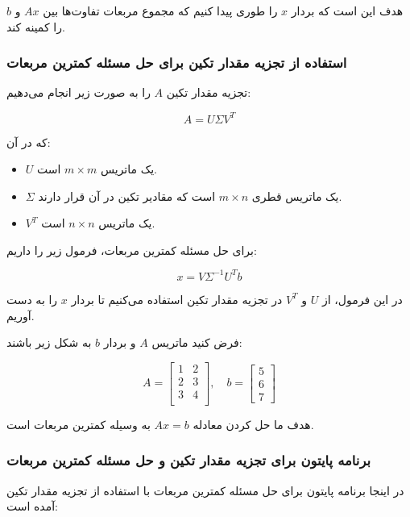 هدف این است که بردار \(x\) را طوری پیدا کنیم که مجموع مربعات تفاوت‌ها بین \(Ax\) و \(b\) را کمینه کند.

\subsubsection{استفاده از تجزیه مقدار تکین برای حل مسئله کمترین مربعات}

تجزیه مقدار تکین \(A\) را به صورت زیر انجام می‌دهیم:

\[
A = U \Sigma V^T
\]

که در آن:

\begin{itemize}
	\item \(U\) یک ماتریس \(m \times m\) است.
	\item \(\Sigma\) یک ماتریس قطری \(m \times n\) است که مقادیر تکین در آن قرار دارند.
	\item \(V^T\) یک ماتریس \(n \times n\) است.
\end{itemize}

برای حل مسئله کمترین مربعات، فرمول زیر را داریم:

\[
x = V \Sigma^{-1} U^T b
\]

در این فرمول، از \(U\) و \(V^T\) در تجزیه مقدار تکین استفاده می‌کنیم تا بردار \(x\) را به دست آوریم.



\begin{example}
	فرض کنید ماتریس \(A\) و بردار \(b\) به شکل زیر باشند:
	
	\[
	A = \begin{bmatrix} 
		1 & 2 \\
		2 & 3 \\
		3 & 4 \\
	\end{bmatrix}, \quad b = \begin{bmatrix} 5 \\ 6 \\ 7 \end{bmatrix}
	\]
	
	هدف ما حل کردن معادله \(Ax = b\) به وسیله کمترین مربعات است.
	
\end{example}
\subsubsection{برنامه پایتون برای تجزیه مقدار تکین و حل مسئله کمترین مربعات}

در اینجا برنامه پایتون برای حل مسئله کمترین مربعات با استفاده از تجزیه مقدار تکین آمده است:

